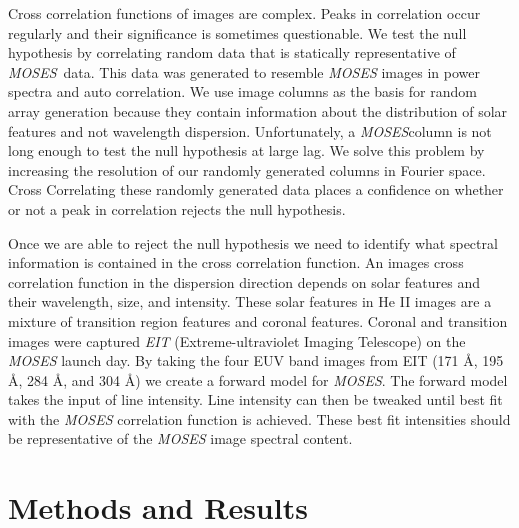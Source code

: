 \documentclass[]{aastex6}
\newcommand{\MOSES}{\textit{MOSES}}
\begin{document}
Cross correlation functions of images are complex.  Peaks in correlation occur regularly and their significance is sometimes questionable.  We test the null hypothesis by correlating random data that is statically representative of \MOSES \ data.  This data was generated to resemble \textit{MOSES} images in power spectra and auto correlation.  We use image columns as the basis for random array generation because they contain information about the distribution of solar features and not wavelength dispersion. Unfortunately, a \MOSES column is not long enough to test the null hypothesis at large lag.  We solve this problem by increasing the resolution of our randomly generated columns in Fourier space.  Cross Correlating these randomly generated data places a confidence on whether or not a peak in correlation rejects the null hypothesis.   

Once we are able to reject the null hypothesis we need to identify what spectral information is contained in the cross correlation function.  An images cross correlation function in the dispersion direction depends on solar features and their wavelength, size, and intensity.  These solar features in He II images are a mixture of transition region features and coronal features. Coronal and transition images were captured \textit{EIT} (Extreme-ultraviolet Imaging Telescope) on the \textit{MOSES} launch day.  By taking the four EUV band images from EIT (171 \AA , 195 \AA , 284 \AA , and 304 \AA ) we create a forward model for \textit{MOSES}.  The forward model takes the input of line intensity.  Line intensity can then be tweaked until best fit with the \textit{MOSES} correlation function is achieved. These best fit intensities should be representative of the \textit{MOSES} image spectral content.  

\section{Methods and Results}
\end{document}
